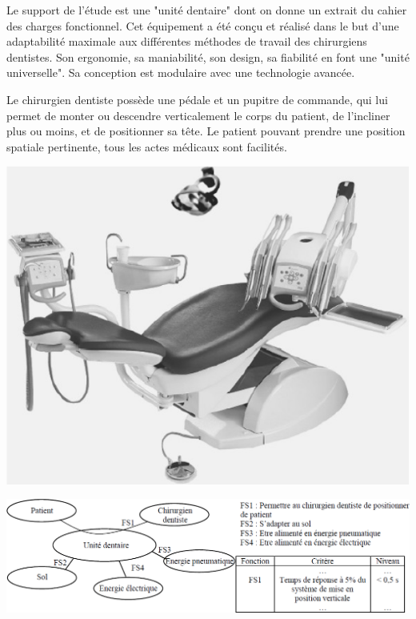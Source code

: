 \begin{minipage}[c]{.6\linewidth}
Le support de l'étude est une "unité dentaire" dont on donne un extrait du cahier des charges fonctionnel. Cet équipement a été conçu et réalisé dans le but d'une adaptabilité maximale aux différentes méthodes de travail des chirurgiens dentistes. Son ergonomie, sa maniabilité, son design, sa fiabilité en font une "unité universelle". Sa conception est modulaire avec une technologie avancée.

Le chirurgien dentiste possède une pédale et un pupitre de commande, qui lui permet de monter ou descendre verticalement le corps du patient, de l'incliner plus ou moins, et de positionner sa tête. Le patient pouvant prendre une position spatiale pertinente, tous les actes médicaux sont facilités.
\end{minipage}\hfill
\begin{minipage}[c]{.35\linewidth}
\begin{center}
\includegraphics[width=.9\textwidth]{png/fig1-dentaire}
\end{center}
\end{minipage}

\begin{center}
\includegraphics[width=.9\textwidth]{png/fig2-dentaire}
\end{center}

